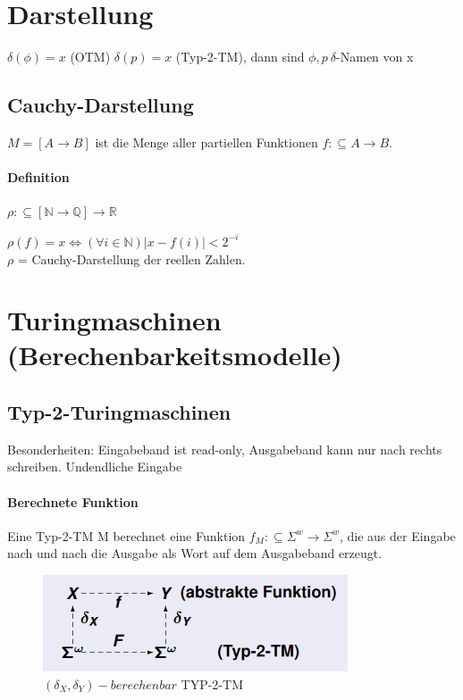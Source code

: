 \documentclass[ngerman]{scrartcl}
\begin{document}
\section{Darstellung}

$ \delta(\phi) = x $ (OTM) $\delta(p) = x $ (Typ-2-TM), dann sind $ \phi, p\ \delta$-Namen von x


\subsection{Cauchy-Darstellung}
$ M = [A \rightarrow B] $ ist die Menge aller partiellen Funktionen $ f : \subseteq A \rightarrow B $.

\paragraph{Definition} $ \rho : \subseteq[\mathbb{N}\rightarrow\mathbb{Q}] \rightarrow \mathbb{R}$

\begin{center}
  $ \rho(f) = x \Leftrightarrow (\forall i \in \mathbb{N})|x-f(i)|< 2^{-i}$ \\
  $ \rho $ = Cauchy-Darstellung der reellen Zahlen.
\end{center}

%
%
\section{Turingmaschinen (Berechenbarkeitsmodelle)}

\subsection{Typ-2-Turingmaschinen}
Besonderheiten: Eingabeband ist read-only, Ausgabeband kann nur nach rechts schreiben. Undendliche Eingabe

\paragraph{Berechnete Funktion}
Eine Typ-2-TM M berechnet eine Funktion $ f_M: \subseteq \Sigma^w \rightarrow \Sigma^w $, die aus der Eingabe nach und nach die Ausgabe als Wort auf dem Ausgabeband erzeugt.

\begin{figure}[h]
  \centering
  \includegraphics{typ2name.PNG}
  \caption{$ (\delta_X, \delta_Y)-berechenbar$ TYP-2-TM}
\end{figure}
\end{document}
